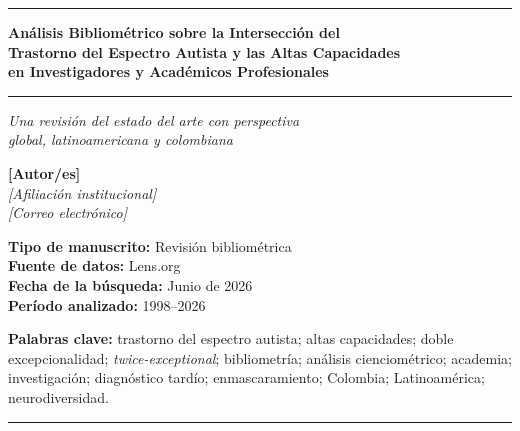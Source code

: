 \documentclass[12pt, a4paper]{article}
\begin{document}

\begin{titlepage}
\centering
\vspace*{1cm}

{\color{azuloscuro}\rule{\linewidth}{2pt}}
\vspace{0.5cm}

{\Large\bfseries Análisis Bibliométrico sobre la Intersección del\\[6pt]
Trastorno del Espectro Autista y las Altas Capacidades\\[6pt]
en Investigadores y Académicos Profesionales}

\vspace{0.4cm}
{\color{rojooscuro}\rule{\linewidth}{0.8pt}}

\vspace{0.8cm}

{\large\itshape Una revisión del estado del arte con perspectiva\\
global, latinoamericana y colombiana}

\vspace{1.2cm}

{\normalsize
\textbf{[Autor/es]}\\[4pt]
\textit{[Afiliación institucional]}\\[4pt]
\textit{[Correo electrónico]}
}

\vspace{1.2cm}

{\normalsize
\textbf{Tipo de manuscrito:} Revisión bibliométrica\\[4pt]
\textbf{Fuente de datos:} Lens.org\\[4pt]
\textbf{Fecha de la búsqueda:} Junio de 2026\\[4pt]
\textbf{Período analizado:} 1998--2026
}

\vspace{1.5cm}

\begin{notabox}
\small
\textbf{Palabras clave:} trastorno del espectro autista; altas capacidades; doble
excepcionalidad; \textit{twice-exceptional}; bibliometría; análisis cienciométrico;
academia; investigación; diagnóstico tardío; enmascaramiento; Colombia;
Latinoamérica; neurodiversidad.
\end{notabox}

\vfill
{\color{azuloscuro}\rule{\linewidth}{2pt}}
\end{titlepage}
\end{document}
